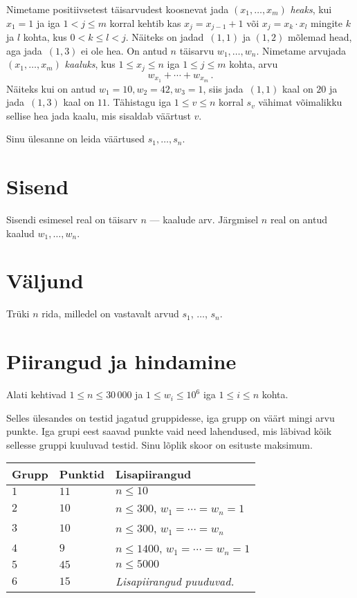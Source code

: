 
\noindent
Nimetame positiivsetest täisarvudest koosnevat jada $(x_1,\ldots,x_m)$ \emph{heaks}, kui $x_1 = 1$
ja iga $1 < j \leq m$ korral kehtib kas $x_j=x_{j-1}+1$ või $x_j=x_k\cdot x_l$ mingite $k$ ja $l$
kohta, kus $0< k\leq l< j$.
Näiteks on jadad~$(1,1)$ ja $(1,2)$ mõlemad head, aga jada~$(1,3)$ ei ole hea.
On antud $n$ täisarvu $w_1,\ldots,w_n$. Nimetame arvujada $(x_1,\ldots,x_m)$ \emph{kaaluks}, kus
$1\leq x_j \leq n$ iga $1\leq j\leq m$ kohta, arvu
\[ w_{x_1} +\cdots +w_{x_m}\,.\] 
Näiteks kui on antud $w_1=10,  w_2=42,w_3= 1$, siis jada~$(1,1)$ kaal on $20$ ja jada~$(1,3)$ kaal
on $11$.
Tähistagu iga $1\leq v\leq n$ korral $s_v$ vähimat võimalikku sellise hea jada kaalu, mis sisaldab väärtust $v$.

Sinu ülesanne on leida väärtused $s_1,\ldots ,s_n$.

\section*{Sisend}

Sisendi esimesel real on täisarv $n$ --- kaalude arv.
Järgmisel $n$ real on antud kaalud $w_1, \ldots, w_n$.

\section*{Väljund}

Trüki $n$ rida, milledel on vastavalt arvud $s_1$, $\ldots$, $s_n$.

\section*{Piirangud ja hindamine}

Alati kehtivad
$1\leq n \leq 30\,000$ %
ja
$1\leq w_i \leq 10^6$ iga $1\leq i \leq n$ kohta.%

Selles ülesandes on testid jagatud gruppidesse, iga grupp on väärt mingi arvu punkte.
Iga grupi eest saavad punkte vaid need lahendused, mis läbivad kõik sellesse gruppi kuuluvad testid.
Sinu lõplik skoor on esituste maksimum.

\medskip
\begin{tabular}{lll}
Grupp & Punktid & Lisapiirangud \\\hline
$1$   & $11$ & $n\leq 10$ \\
$2$   & $10$ & $n\leq 300$, $w_1=\cdots=w_n = 1$ \\
$3$   & $10$ & $n\leq 300$, $w_1=\cdots=w_n$ \\ %
$4$   & $9$ & $n\leq 1400$, $w_1=\cdots=w_n = 1$ \\
$5$   & $45$ & $n\leq 5000$\\
$6$   & $15$ & \emph{Lisapiirangud puuduvad.}
\end{tabular}
